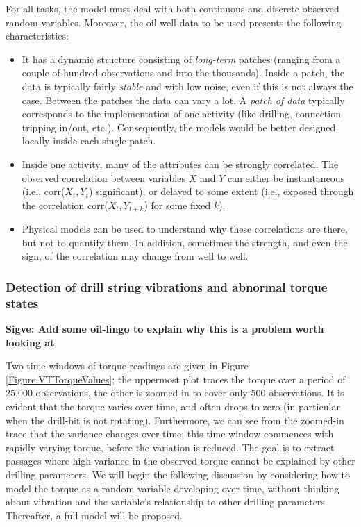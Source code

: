 For all tasks, the model must deal with both continuous and discrete observed random variables. Moreover, the oil-well data to be used presents the following characteristics: 

\begin{itemize}

\item It has a dynamic structure consisting of \emph{long-term} patches (ranging from a couple of hundred observations and into the thousands). Inside a patch, the data is typically fairly \emph{stable} and with low noise, even if this is not always the case. Between the patches the data can vary a lot. A \emph{patch of data} typically corresponds to the implementation of one activity (like drilling, connection tripping in/out, etc.). Consequently, the models would be better designed locally inside each single patch.

\item Inside one activity, many of the attributes can be strongly correlated. The observed correlation between variables $X$ and $Y$ can either be instantaneous (i.e., corr($X_t, Y_t$) significant), or delayed to some extent (i.e., exposed through the correlation corr($X_t, Y_{t+k}$) for some fixed $k$).

\item Physical models can be used to understand why these correlations are there, but not to quantify them. In addition, sometimes the strength, and even the sign, of the correlation may change from well to well.

\end{itemize}



\subsubsection{Detection of drill string vibrations and abnormal torque states}\label{SubSection:DetectionTorque}

{\bf Sigve: Add some oil-lingo to explain why this is a problem worth looking at}




Two time-windows of torque-readings are given in Figure \ref{Figure:VTTorqueValues}; the uppermost plot traces the torque over a period of 25.000 observations, the other is zoomed in to cover only 500 observations. It is evident that the torque varies over time, and often drops to zero (in particular when the drill-bit is not rotating). Furthermore, we can see from the zoomed-in trace that the variance changes over time; this time-window commences with rapidly varying torque, before the variation is reduced. The goal is to extract passages where high variance in the observed torque cannot be explained by other drilling parameters. 
We will begin the following discussion by considering how to model the torque as a random variable developing over time, without thinking about vibration and the variable's relationship to other drilling parameters.   
Thereafter, a full model will be proposed.

